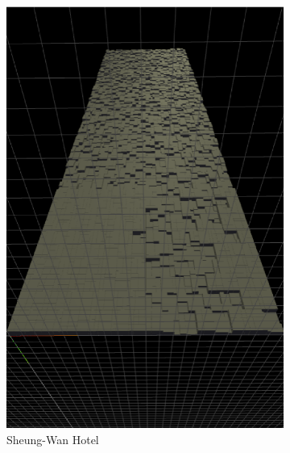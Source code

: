 \begin{figure}
\begin{subfigure}[b]{0.3\linewidth}
    \includegraphics[width=1.0\linewidth]{./images/all_examples/sheung_wan_hotel_crop}
    \caption{Sheung-Wan Hotel}
    \label{fig:ex:sheung:wan}
  \end{subfigure}
  \begin{subfigure}[b]{0.3\linewidth}

\end{subfigure}
\end{figure}

